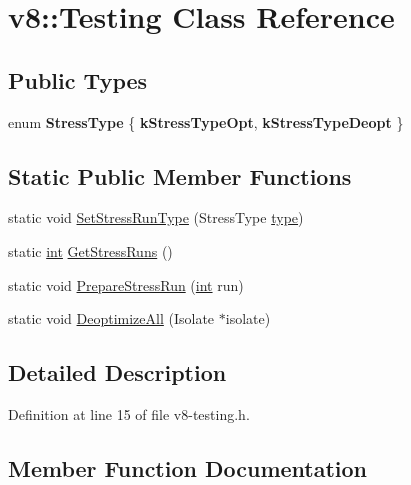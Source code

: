 \hypertarget{classv8_1_1Testing}{}\section{v8\+:\+:Testing Class Reference}
\label{classv8_1_1Testing}
\subsection*{Public Types}
\begin{DoxyCompactItemize}
\item 
\mbox{\label{classv8_1_1Testing_a436a1a521a0bc070cc0b46ad7a658575}} 
enum {\bfseries Stress\+Type} \{ {\bfseries k\+Stress\+Type\+Opt}, 
{\bfseries k\+Stress\+Type\+Deopt}
 \}
\end{DoxyCompactItemize}
\subsection*{Static Public Member Functions}
\begin{DoxyCompactItemize}
\item 
static void \mbox{\hyperlink{classv8_1_1Testing_ae77a4350f86d915ffa3dacc30f07d74b}{Set\+Stress\+Run\+Type}} (Stress\+Type \mbox{\hyperlink{classstd_1_1conditional_1_1type}{type}})
\item 
static \mbox{\hyperlink{classint}{int}} \mbox{\hyperlink{classv8_1_1Testing_a85ab1c8e52fa31fabbf7c44096cdd070}{Get\+Stress\+Runs}} ()
\item 
static void \mbox{\hyperlink{classv8_1_1Testing_aae3f1fc97dc6e4e52a9f4cfef55f8672}{Prepare\+Stress\+Run}} (\mbox{\hyperlink{classint}{int}} run)
\item 
static void \mbox{\hyperlink{classv8_1_1Testing_a10e371c433b21a61d1b857db753d6a9b}{Deoptimize\+All}} (Isolate $\ast$isolate)
\end{DoxyCompactItemize}


\subsection{Detailed Description}


Definition at line 15 of file v8-\/testing.\+h.



\subsection{Member Function Documentation}
\mbox{\label{classv8_1_1Testing_a10e371c433b21a61d1b857db753d6a9b}} 

